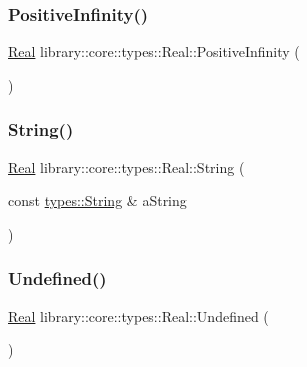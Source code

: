 \subsubsection{\texorpdfstring{Positive\+Infinity()}{PositiveInfinity()}}
{\footnotesize\ttfamily \hyperlink{classlibrary_1_1core_1_1types_1_1Real}{Real} library\+::core\+::types\+::\+Real\+::\+Positive\+Infinity (\begin{DoxyParamCaption}{ }\end{DoxyParamCaption})\hspace{0.3cm}{\ttfamily [static]}}

\mbox{\label{classlibrary_1_1core_1_1types_1_1Real_ac0209eca829dcdc3b1be96f834763d8e}} 
\subsubsection{\texorpdfstring{String()}{String()}}
{\footnotesize\ttfamily \hyperlink{classlibrary_1_1core_1_1types_1_1Real}{Real} library\+::core\+::types\+::\+Real\+::\+String (\begin{DoxyParamCaption}\item[{const \hyperlink{classlibrary_1_1core_1_1types_1_1String}{types\+::\+String} \&}]{a\+String }\end{DoxyParamCaption})\hspace{0.3cm}{\ttfamily [static]}}

\mbox{\label{classlibrary_1_1core_1_1types_1_1Real_a67778e3d4c5a5b6ca6ddcd47964b9a79}} 
\subsubsection{\texorpdfstring{Undefined()}{Undefined()}}
{\footnotesize\ttfamily \hyperlink{classlibrary_1_1core_1_1types_1_1Real}{Real} library\+::core\+::types\+::\+Real\+::\+Undefined (\begin{DoxyParamCaption}{ }\end{DoxyParamCaption})\hspace{0.3cm}{\ttfamily [static]}}

